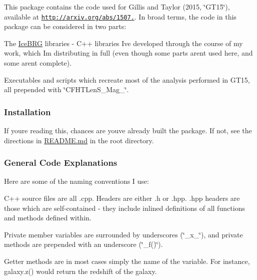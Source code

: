This package contains the code used for Gillis and Taylor (2015, \char`\"{}\+G\+T15\char`\"{}), available at \href{http://arxiv.org/abs/1507.01858}{\tt http\+://arxiv.\+org/abs/1507.}. In broad terms, the code in this package can be considered in two parts\+:


\begin{DoxyEnumerate}
\item The \hyperlink{namespaceIceBRG}{Ice\+B\+R\+G} libraries -\/ C++ libraries I\textquotesingle{}ve developed through the course of my work, which I\textquotesingle{}m distributing in full (even though some parts aren\textquotesingle{}t used here, and some aren\textquotesingle{}t complete).
\item Executables and scripts which recreate most of the analysis performed in G\+T15, all prepended with \char`\"{}\+C\+F\+H\+T\+Len\+S\+\_\+\+Mag\+\_\+\char`\"{}.
\end{DoxyEnumerate}

\subsubsection*{Installation}

If you\textquotesingle{}re reading this, chances are you\textquotesingle{}ve already built the package. If not, see the directions in \hyperlink{README_8md}{R\+E\+A\+D\+M\+E.\+md} in the root directory.

\subsubsection*{General Code Explanations}

Here are some of the naming conventions I use\+:


\begin{DoxyItemize}
\item C++ source files are all .cpp. Headers are either .h or .hpp. .hpp headers are those which are self-\/contained -\/ they include inlined definitions of all functions and methods defined within.
\item Private member variables are surrounded by underscores (\char`\"{}\+\_\+x\+\_\+\char`\"{}), and private methods are prepended with an underscore (\char`\"{}\+\_\+f()\char`\"{}).
\item Getter methods are in most cases simply the name of the variable. For instance, galaxy.\+z() would return the redshift of the galaxy.
\end{DoxyItemize}

